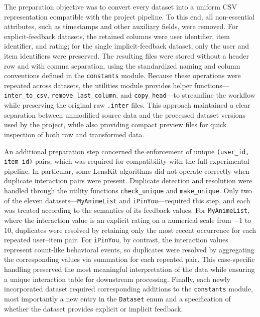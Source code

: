 \documentclass[12pt,a4paper]{article}
\begin{document}
The preparation objective was to convert every dataset into a uniform CSV representation compatible with the project pipeline. To this end, all non-essential attributes, such as timestamps and other auxiliary fields, were removed. For explicit-feedback datasets, the retained columns were user identifier, item identifier, and rating; for the single implicit-feedback dataset, only the user and item identifiers were preserved. The resulting files were stored without a header row and with comma separation, using the standardized naming and column conventions defined in the \texttt{constants} module. Because these operations were repeated across datasets, the utilities module provides helper functions---\texttt{inter\_to\_csv}, \texttt{remove\_last\_column}, and \texttt{copy\_head}---to streamline the workflow while preserving the original raw \texttt{.inter} files. This approach maintained a clear separation between unmodified source data and the processed dataset versions used by the project, while also providing compact preview files for quick inspection of both raw and transformed data.

An additional preparation step concerned the enforcement of unique \texttt{(user\_id, item\_id)} pairs, which was required for compatibility with the full experimental pipeline. In particular, some LensKit algorithms did not operate correctly when duplicate interaction pairs were present. Duplicate detection and resolution were handled through the utility functions \texttt{check\_unique} and \texttt{make\_unique}. Only two of the eleven datasets---\texttt{MyAnimeList} and \texttt{iPinYou}---required this step, and each was treated according to the semantics of its feedback values. For \texttt{MyAnimeList}, where the interaction value is an explicit rating on a numerical scale from $-1$ to $10$, duplicates were resolved by retaining only the most recent occurrence for each repeated user--item pair. For \texttt{iPinYou}, by contrast, the interaction values represent count-like behavioral events, so duplicates were resolved by aggregating the corresponding values via summation for each repeated pair. This case-specific handling preserved the most meaningful interpretation of the data while ensuring a unique interaction table for downstream processing. Finally, each newly incorporated dataset required corresponding additions to the \texttt{constants} module, most importantly a new entry in the \texttt{Dataset} enum and a specification of whether the dataset provides explicit or implicit feedback.
\end{document}
